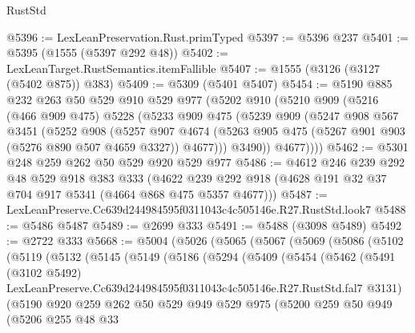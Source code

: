 \begin{lexlean}{RustStd}
\begin{coremodule}
@5396 := LexLeanPreservation.Rust.primTyped
@5397 := @5396 @237
@5401 := @5395 (@1555 (@5397 @292 @48))
@5402 := LexLeanTarget.RustSemantics.itemFallible
@5407 := @1555 (@3126 (@3127 (@5402 @875)) @383)
@5409 := @5309 (@5401 @5407)
@5454 := @5190
    @885
    @232
    @263
    @50
    @529
    @910
    @529
    @977
    (@5202
      @910
      (@5210
        @909
        (@5216
          (@466 @909 @475)
          @5228
          (@5233
            @909
            @475
            (@5239
              @909
              (@5247
                @908
                @567
                @3451
                (@5252
                  @908
                  (@5257
                    @907
                    @4674
                    (@5263 @905 @475 (@5267 @901 @903 (@5276 @890 @507 @4659 @3327)) @4677)))
                @3490))
            @4677))))
@5462 := @5301 @248 @259 @262 @50 @529 @920 @529 @977
@5486 := @4612
    @246
    @239
    @292
    @48
    @529
    @918
    @383
    @333
    (@4622 @239 @292 @918 (@4628 @191 @32 @37 @704 @917 @5341 (@4664 @868 @475 @5357 @4677)))
@5487 := LexLeanPreserve.Cc639d244984595f0311043c4c505146e.R27.RustStd.look7
@5488 := @5486 @5487
@5489 := @2699 @333
@5491 := @5488 (@3098 @5489)
@5492 := @2722 @333
@5668 := @5004
    (@5026
      (@5065
        (@5067
          (@5069
            (@5086
              (@5102
                (@5119
                  (@5132
                    (@5145
                      (@5149
                        (@5186
                          (@5294
                            (@5409
                              (@5454
                                (@5462
                                  (@5491
                                    (@3102 @5492)
                                    LexLeanPreserve.Cc639d244984595f0311043c4c505146e.R27.RustStd.fal7
                                    @3131)
                                  (@5190
                                    @920
                                    @259
                                    @262
                                    @50
                                    @529
                                    @949
                                    @529
                                    @975
                                    (@5200
                                      @259
                                      @50
                                      @949
                                      (@5206
                                        @255
                                        @48
                                        @33

\end{coremodule}
\end{lexlean}
